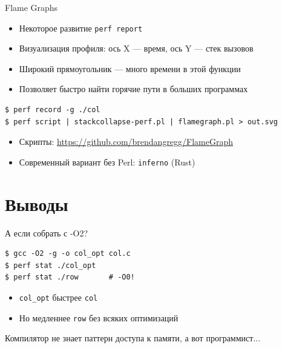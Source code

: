 \documentclass[aspectratio=169, russian]{beamer}
\begin{document}
\begin{frame}[fragile]{Flame Graphs}
    \begin{itemize}
        \item Некоторое развитие \texttt{perf report}
        \item Визуализация профиля: ось X --- время, ось Y --- стек вызовов
        \item Широкий прямоугольник --- много времени в этой функции
        \item Позволяет быстро найти горячие пути в больших программах
    \end{itemize}

    \bigskip
    \begin{verbatim}
$ perf record -g ./col
$ perf script | stackcollapse-perf.pl | flamegraph.pl > out.svg
\end{verbatim}

    \bigskip
    \begin{itemize}
        \item Скрипты: \url{https://github.com/brendangregg/FlameGraph}
        \item Современный вариант без Perl: \texttt{inferno} (Rust)
    \end{itemize}
\end{frame}

\section{Выводы}

\begin{frame}[fragile]{А если собрать с -O2?}
    \begin{verbatim}
$ gcc -O2 -g -o col_opt col.c
$ perf stat ./col_opt
$ perf stat ./row       # -O0!
\end{verbatim}

    \bigskip
    \begin{itemize}
        \item \texttt{col\_opt} быстрее \texttt{col}
        \item Но медленнее \texttt{row} без всяких оптимизаций
    \end{itemize}

    \bigskip

    Компилятор не знает паттерн доступа к памяти, а вот программист...

\end{frame}
\end{document}
